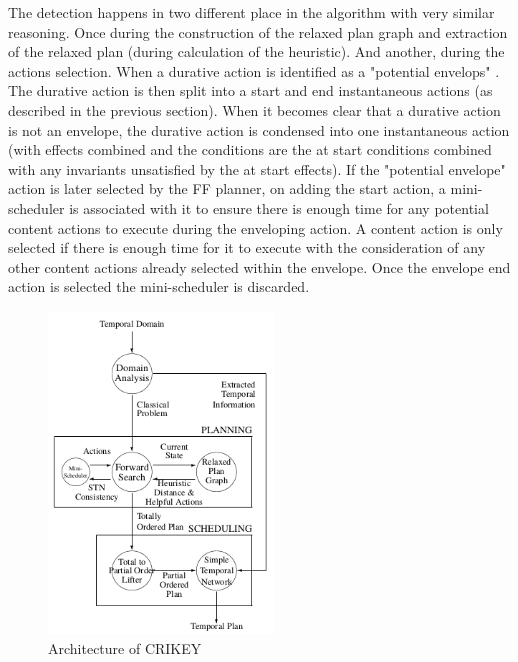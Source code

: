 \documentclass
[a4paper
,english
,parskip=half
,bibliography=totoc
]{scrreprt}
\begin{document}
    The detection happens in two different place in the algorithm with very similar reasoning. Once during the construction of the relaxed plan graph and extraction of the relaxed plan (during calculation of the heuristic). And another, during the actions selection. When a durative action is identified as a "potential envelops" . The durative action is then split into a start and end instantaneous actions (as described in the previous section). When it becomes clear that a durative action  is not an envelope, the durative action is condensed into one instantaneous action (with effects combined and the conditions are the at start conditions combined with any invariants unsatisfied by the at start effects). If the "potential envelope" action is later selected by the FF planner, on adding the start action, a mini-scheduler is associated with it to ensure there is enough time for any potential content actions to execute during the enveloping action. A content action is only selected if there is enough time for it to execute with the consideration of any other content actions already selected within the envelope. Once the envelope end action is selected the mini-scheduler is discarded.


    \begin{figure}[h]
        \centering    
        \includegraphics[width=6cm]{architecture_crikey.png}
        \caption{Architecture of CRIKEY}
         \label{fig:arch_crikey}
    \end{figure}
\end{document}
